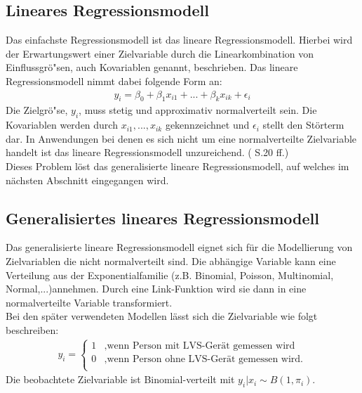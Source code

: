\documentclass[12pt]{scrreprt}
\begin{document}
\subsection{Lineares Regressionsmodell}
Das einfachste Regressionsmodell ist das lineare Regressionsmodell. Hierbei wird der Erwartungswert einer Zielvariable durch die Linearkombination von Einflussgrö"sen, auch Kovariablen genannt, beschrieben. Das lineare Regressionsmodell nimmt dabei folgende Form an:
\begin{align}
y_{i}= \beta_{0}+\beta_{1}x_{i1}+...+\beta_{k}x_{ik}+\epsilon_{i}
\end{align}
Die Zielgrö"se, $y_{i}$, muss stetig und approximativ normalverteilt sein. Die Kovariablen werden durch $x_{i1},...,x_{ik}$ gekennzeichnet und $\epsilon_{i}$ stellt den Störterm dar. In Anwendungen bei denen es sich nicht um eine normalverteilte Zielvariable handelt ist das lineare Regressionsmodell unzureichend. (\cite{fahrmeir2007regression} S.20 ff.) \\
Dieses Problem löst das generalisierte lineare Regressionsmodell, auf welches im nächsten Abschnitt eingegangen wird. 

\subsection{Generalisiertes lineares Regressionsmodell}
Das generalisierte lineare Regressionsmodell eignet sich für die Modellierung von Zielvariablen die nicht normalverteilt sind. Die abhängige Variable kann eine Verteilung aus der Exponentialfamilie (z.B. Binomial, Poisson, Multinomial, Normal,...)annehmen. Durch eine Link-Funktion wird sie dann in eine normalverteilte Variable transformiert. \\
Bei den später verwendeten Modellen lässt sich die Zielvariable wie folgt beschreiben: \\
\begin{align}
y_{i}=\begin{cases}
1 & \text{,wenn Person mit LVS-Gerät gemessen wird } \\
0 & \text{,wenn Person ohne LVS-Gerät gemessen wird.} \\
\end{cases}
\end{align}
Die beobachtete Zielvariable ist Binomial-verteilt mit $y_{i}|x_{i}\sim B(1,\pi_{i})$. \\
\end{document}
